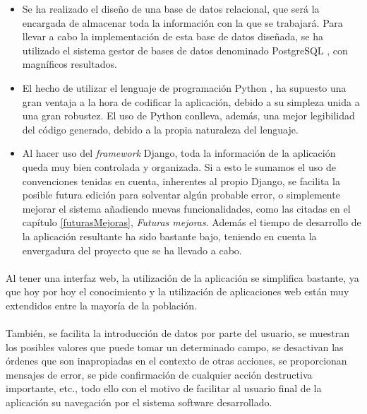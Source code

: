 \begin{itemize}
 \item Se ha realizado el diseño de una base de datos relacional, que será la
 encargada de almacenar toda la información con la que se trabajará. Para llevar
 a cabo la implementación de esta base de datos diseñada, se ha utilizado el
 sistema gestor de bases de datos denominado PostgreSQL \cite{postgresql}, con
 magníficos resultados.
 \item El hecho de utilizar el lenguaje de programación Python \cite{python}, ha
 supuesto una gran ventaja a la hora de codificar la aplicación, debido a su
 simpleza unida a una gran robustez. El uso de Python conlleva, además,
 una mejor legibilidad del código generado, debido a la propia naturaleza del
 lenguaje.
 \item Al hacer uso del \textit{framework} Django, toda la información de la
 aplicación queda muy bien controlada y organizada. Si a esto le sumamos el uso
 de convenciones tenidas en cuenta, inherentes al propio Django, se facilita la
 posible futura edición para solventar algún probable error, o simplemente
 mejorar el sistema añadiendo nuevas funcionalidades, como las citadas en el
 capítulo \ref{futurasMejoras}, \textit{Futuras mejoras}. Además el tiempo de
 desarrollo de la aplicación resultante ha sido bastante bajo, teniendo en
 cuenta la envergadura del proyecto que se ha llevado a cabo.
\end{itemize}

\paragraph{}Al tener una interfaz web, la utilización de la aplicación se
simplifica bastante, ya que hoy por hoy el conocimiento y la utilización de
aplicaciones web están muy extendidos entre la mayoría de la población.

\paragraph{}También, se facilita la introducción de datos por parte del usuario,
se muestran los posibles valores que puede tomar un determinado campo, se
desactivan las órdenes que son inapropiadas en el contexto de otras acciones, se
proporcionan mensajes de error, se pide confirmación de cualquier acción
destructiva importante, etc., todo ello con el motivo de facilitar al usuario
final de la aplicación su navegación por el sistema software desarrollado.

